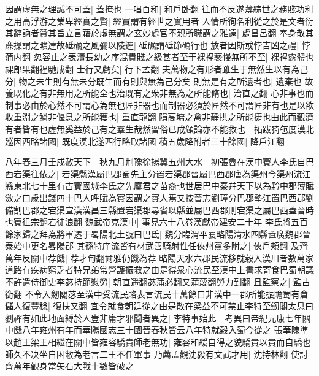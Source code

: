 因謂虛無之理誠不可蓋|{
	蓋掩也}
一唱百和|{
	和戶卧翻}
往而不反遂薄綜世之務賤功利之用高浮游之業卑經實之賢|{
	經實謂有經世之實用者}
人情所徇名利從之於是文者衍其辭訥者贊其旨立言藉於虛無謂之玄妙處官不親所職謂之雅遠|{
	處昌呂翻}
奉身散其亷操謂之曠達故砥礪之風彌以陵遲|{
	砥礪謂砥節礪行也}
放者因斯或悖吉凶之禮|{
	悖蒲内翻}
忽容止之表瀆長幼之序混貴賤之級甚者至于裸裎䙝慢無所不至|{
	裸裎露體也祼郎果翻裎馳成翻}
士行又虧矣|{
	行下孟翻}
夫萬物之有形者雖生于無然生以有為己分|{
	物之未生則有無未分既生而有則與無為己分矣}
則無是有之所遺者也|{
	遺棄也}
故養既化之有非無用之所能全也治既有之衆非無為之所能脩也|{
	治直之翻}
心非事也而制事必由於心然不可謂心為無也匠非器也而制器必須於匠然不可謂匠非有也是以欲收重淵之鱗非偃息之所能獲也|{
	重直龍翻}
隕高墉之禽非靜拱之所能捷也由此而觀濟有者皆有也虚無奚益於己有之羣生哉然習俗已成頠論亦不能救也　拓跋猗㐌度漠北廵因西略諸國|{
	既度漠北遂西行略取諸國}
積五歲降附者三十餘國|{
	降戶江翻}


八年春三月壬戍赦天下　秋九月荆豫徐揚冀五州大水　初張魯在漢中賨人李氏自巴西宕渠往依之|{
	宕渠縣漢屬巴郡蜀先主分置宕渠郡晉屬巴西郡唐為渠州今渠州流江縣東北七十里有古賨國城李氏之先廩君之苗裔也世居巴中秦幷天下以為黔中郡薄賦斂之口歲出錢四十巴人呼賦為賨因謂之賨人焉又按晉志劉璋分巴郡墊江置巴西郡劉備割巴郡之宕渠宣漢漢昌三縣置宕渠郡尋省以縣並屬巴西郡則宕渠之屬巴西蓋晉時也賨徂宗翻宕徒浪翻}
魏武帝克漢中|{
	事見六十八卷漢獻帝建安二十年}
李氏將五百餘家歸之拜為將軍遷于畧陽北土號曰巴氐|{
	魏分臨渭平襄略陽清水四縣置廣魏郡晉泰始中更名畧陽郡}
其孫特庠流皆有材武善騎射性任俠州黨多附之|{
	俠戶頰翻}
及齊萬年反關中荐饑|{
	荐才甸翻爾雅仍饑為荐}
略陽天水六郡民流移就穀入漢川者數萬家道路有疾病窮乏者特兄弟常營護振救之由是得衆心流民至漢中上書求寄食巴蜀朝議不許遣侍御史李苾持節慰勞|{
	朝直遥翻苾蒲必翻又蒲蔑翻勞力到翻}
且監察之|{
	監古銜翻}
不令入劒閣苾至漢中受流民賂表言流民十萬餘口非漢中一郡所能振贍蜀有倉儲人復豐稔|{
	復扶又翻}
宜令就食朝廷從之由是散在梁益不可禁止李特至劒閣太息曰劉禪有如此地面縛於人豈非庸才邪聞者異之|{
	李特事始此　考異曰帝紀元康七年關中饑八年雍州有年而華陽國志三十國晉春秋皆云八年特就穀入蜀今從之}
張華陳準以趙王梁王相繼在關中皆雍容驕貴師老無功|{
	雍容和緩自得之貌驕貴以貴而自驕也師久不决坐自困敝為老言二王不任軍事}
乃薦孟觀沈毅有文武才用|{
	沈持林翻}
使討齊萬年觀身當矢石大戰十數皆破之


